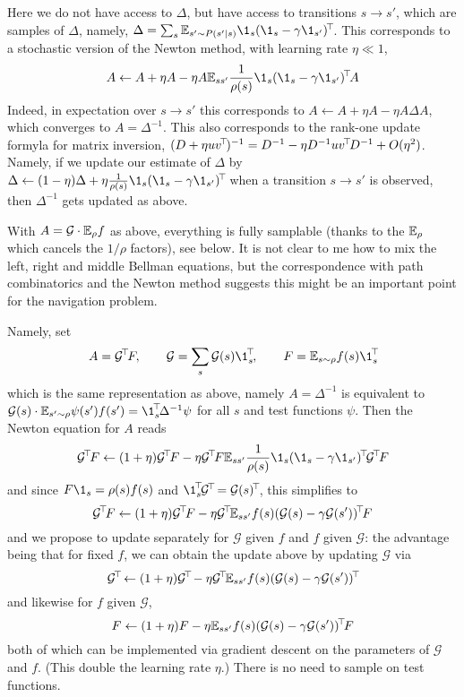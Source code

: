 \documentclass[11pt,a4paper]{article}
\newcommand{\green}{\mathcal{G}}
\begin{document}
Here we do not have access to $\Delta$, but have access to transitions
$s\to s'$, which are samples of
$\Delta$, namely, $\Delta=\sum_s\E_{s'\sim P(s'|s)} \1_s\transp{(\1_s-\gamma
\1_{s'})}$. This corresponds to a stochastic version of the Newton
method, with learning rate $\eta\ll 1$,
\begin{equation}
A\gets A+\eta A-\eta A \E_{ss'} \frac{1}{\rho(s)}\1_s\transp{(\1_s-\gamma \1_{s'})} A
\end{equation}
Indeed, in expectation over $s\to s'$ this corresponds to $A\gets A+\eta
A-\eta A \Delta A$, which converges to $A=\Delta^{-1}$. This
also corresponds to the rank-one update formyla for matrix inversion,
$(D+\eta uv^{\!\top}\!)^{-1}=D^{-1}-\eta
D^{-1}uv^{\!\top}\!D^{-1}+O(\eta^2)$. Namely,
if we update our estimate of $\Delta$ by
$\Delta\gets (1-\eta)\Delta+\eta \frac{1}{\rho(s)} \1_s\transp{(\1_s-\gamma
\1_{s'})}$ when a transition $s\to s'$ is observed, then
$\Delta^{-1}$ gets updated as above.

With $A=\green\cdot \E_{\rho} f$ as above, everything is fully samplable
(thanks to the $\mathbb{E}_\rho$ which cancels the $1/\rho$ factors), see below.
It is not clear to me how to mix the left, right and middle Bellman
equations, but the correspondence with path combinatorics and the Newton
method suggests this
might be an important point for the navigation problem.

Namely, set
\begin{equation}
A=\transp{\green}F, \qquad \green=\sum_s \green(s)\transp{\1_s},\qquad F=\E_{s\sim
\rho}
f(s)\transp{\1_s}
\end{equation}
which is the same representation as above, namely $A=\Delta^{-1}$ is
equivalent to $\green(s)\cdot \E_{s'\sim
\rho} \psi(s')f(s')=\transp{\1_s}\Delta^{-1}\psi$ for all $s$ and test
functions $\psi$. Then the Newton equation for $A$ reads
\begin{equation}
\transp{\green}F\gets (1+\eta)\transp{\green}F-\eta \transp{\green}F \E_{ss'} \frac{1}{\rho(s)}\1_s\transp{(\1_s-\gamma
\1_{s'})} \transp{\green}F
\end{equation}
and since $F\1_s=\rho(s)f(s)$ and
$\transp{\1_s}\transp{\green}=\transp{\green(s)}$, this simplifies to
\begin{equation}
\transp{\green}F\gets (1+\eta)\transp{\green}F-\eta
\transp{\green} \E_{ss'} f(s)\transp{(\green(s)-\gamma
\green(s'))}F
\end{equation}
and we propose to update separately for $\green$ given $f$ and $f$ given
$\green$: the advantage being that for fixed $f$, we can obtain the
update above by updating $\green$ via
\begin{equation}
\transp{\green}\gets (1+\eta)\transp{\green}-\eta
\transp{\green} \E_{ss'} f(s)\transp{(\green(s)-\gamma
\green(s'))}
\end{equation}
and likewise for $f$ given $\green$,
\begin{equation}
F\gets (1+\eta)F-\eta
\E_{ss'} f(s)\transp{(\green(s)-\gamma
\green(s'))}F
\end{equation}
both of which can be implemented via gradient descent on the parameters
of $\green$ and $f$. (This double the learning rate $\eta$.)
There is no need to sample on test functions.
\end{document}
